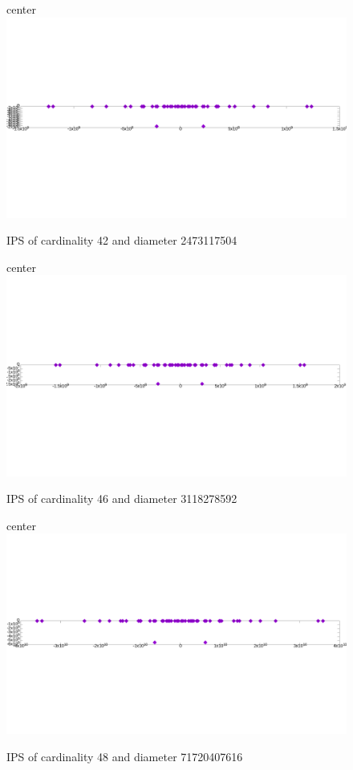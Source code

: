 \documentclass[12pt]{article}
\theoremstyle{theorem}
\theoremstyle{dfn}
\theoremstyle{remark}
\begin{document}
\begin{figure}[h!]
center{\includegraphics[width=1\linewidth]{./img/42_symm.png}}
\parbox{1\linewidth}{\caption{IPS of cardinality 42 and diameter 2473117504}
\label{42_symm.png}}
\end{figure}

\begin{figure}[h!]
center{\includegraphics[width=1\linewidth]{./img/46_symm.png}}
\parbox{1\linewidth}{\caption{IPS of cardinality 46 and diameter 3118278592}
\label{46_symm.png}}
\end{figure}

\begin{figure}[h!]
center{\includegraphics[width=1\linewidth]{./img/48_symm.png}}
\parbox{1\linewidth}{\caption{IPS of cardinality 48 and diameter 71720407616}
\label{48_symm.png}}
\end{figure}
\end{document}
